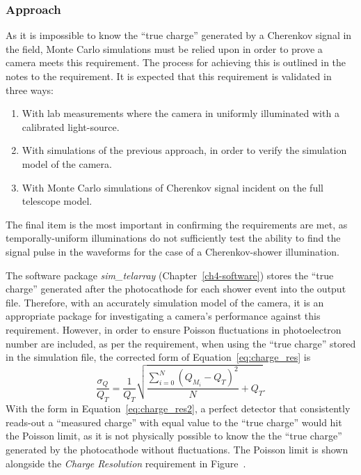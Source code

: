 \subsubsection{Approach}
As it is impossible to know the ``true charge'' generated by a Cherenkov signal in the field, Monte Carlo simulations must be relied upon in order to prove a camera meets this requirement. The process for achieving this is outlined in the notes to the requirement. It is expected that this requirement is validated in three ways:
\begin{enumerate}
\item With lab measurements where the camera in uniformly illuminated with a calibrated light-source.
\item With simulations of the previous approach, in order to verify the simulation model of the camera.
\item With Monte Carlo simulations of Cherenkov signal incident on the full telescope model.
\end{enumerate}
The final item is the most important in confirming the requirements are met, as temporally-uniform illuminations do not sufficiently test the ability to find the signal pulse in the waveforms for the case of a Cherenkov-shower illumination. 

The software package \textit{sim\_telarray} (Chapter~\ref{ch4-software}) stores the ``true charge'' generated after the photocathode for each shower event into the output file. Therefore, with an accurately simulation model of the camera, it is an appropriate package for investigating a camera's performance against this requirement. However, in order to ensure Poisson fluctuations in photoelectron number are included, as per the requirement, when using the ``true charge'' stored in the simulation file, the corrected form of Equation~\ref{eq:charge_res} is
\begin{equation} \label{eq:charge_res2}
\dfrac{\sigma_Q}{Q_T} = \dfrac{1}{Q_T} \sqrt{\dfrac{\sum_{i=0}^N (Q_{M_i} - Q_T)^2}{N} + Q_T}.
\end{equation}
With the form in Equation~\ref{eq:charge_res2}, a perfect detector that consistently reads-out a ``measured charge'' with equal value to the ``true charge'' would hit the Poisson limit, as it is not physically possible to know the the ``true charge'' generated by the photocathode without fluctuations. The Poisson limit is shown alongside the \textit{Charge Resolution} requirement in Figure~.

